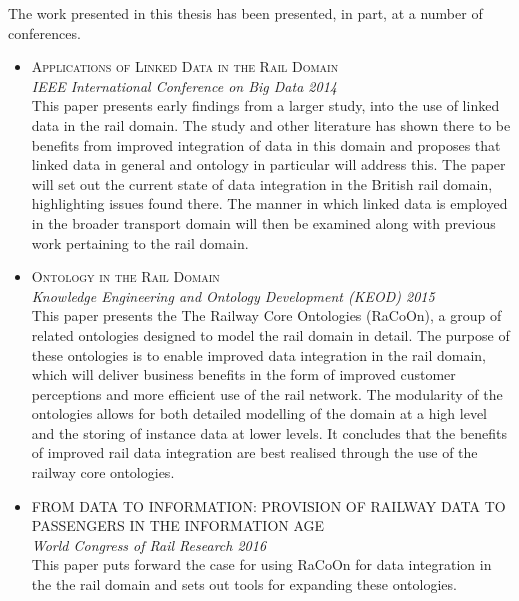 The work presented in this thesis has been presented, in part, at a number of conferences.

\begin{itemize}	
	\item \textsc{Applications of Linked Data in the Rail Domain} \\ \textit{IEEE International Conference on Big Data 2014} \\
	This paper presents early findings from a larger study, into the use of linked data in the rail domain. The study and other literature has shown there to be benefits from improved integration of data in this domain and proposes that linked data in general and ontology in particular will address this. The paper will set out the current state of data integration in the British rail domain, highlighting issues found there. The manner in which linked data is employed in the broader transport domain will then be examined along with previous work pertaining to the rail domain. 
    \item \textsc{Ontology in the Rail Domain} \\ \textit{Knowledge Engineering and Ontology Development (KEOD) 2015} \\
    This paper presents the The Railway Core Ontologies (RaCoOn), a group of related ontologies designed to model the rail domain in detail. The purpose of these ontologies is to enable improved data integration in the rail domain, which will deliver business benefits in the form of improved customer perceptions and more efficient use of the rail network. The modularity of the ontologies allows for both detailed modelling of the domain at a high level and the storing of instance data at lower levels. It concludes that the benefits of improved rail data integration are best realised through the use of the railway core ontologies.   
    \item \textsc{FROM DATA TO INFORMATION: PROVISION OF RAILWAY DATA TO PASSENGERS IN THE INFORMATION AGE} \\ \textit{World Congress of Rail Research 2016} \\
    This paper puts forward the case for using RaCoOn for data integration in the the rail domain and sets out tools for expanding these ontologies.
\end{itemize}